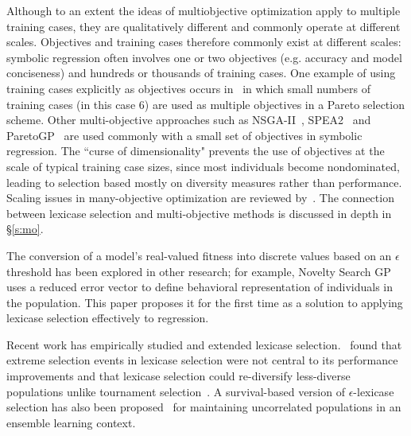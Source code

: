 \documentclass[twoside]{article}
\begin{document}
Although to an extent the ideas of multiobjective optimization apply to multiple training cases, they are qualitatively different and commonly operate at different scales. Objectives and training cases therefore commonly exist at different scales: symbolic regression often involves one or two objectives (e.g. accuracy and model conciseness) and hundreds or thousands of training cases. One example of using training cases explicitly as objectives occurs in~\cite{langdon_evolving_1995} in which small numbers of training cases (in this case 6) are used as multiple objectives in a Pareto selection scheme. Other multi-objective approaches such as NSGA-II~\citep{schoenauer_fast_2000}, SPEA2~\citep{zitzler_spea2:_2001} and ParetoGP~\citep{smits_pareto-front_2005} are used commonly with a small set of objectives in symbolic regression. The ``curse of dimensionality" prevents the use of objectives at the scale of typical training case sizes, since most individuals become nondominated, leading to selection based mostly on diversity measures rather than performance. Scaling issues in many-objective optimization are reviewed by~\cite{ishibuchi_evolutionary_2008}. The connection between lexicase selection and multi-objective methods is discussed in depth in \S\ref{s:mo}.
 
The conversion of a model's real-valued fitness into discrete values based on an $\epsilon$ threshold has been explored in other research; for example, Novelty Search GP~\citep{martinez_searching_2013} uses a reduced error vector to define behavioral representation of individuals in the population. This paper proposes it for the first time as a solution to applying lexicase selection effectively to regression.

Recent work has empirically studied and extended lexicase selection.~\cite{helmuth_impact_2016} found that extreme selection events in lexicase selection were not central to its performance improvements and that lexicase selection could re-diversify less-diverse populations unlike tournament selection~\citep{helmuth_effects_2016}. A survival-based version of $\epsilon$-lexicase selection has also been proposed~\citep{la_cava_general_2017,la_cava_ensemble_2017} for maintaining uncorrelated populations in an ensemble learning context. 
\end{document}

